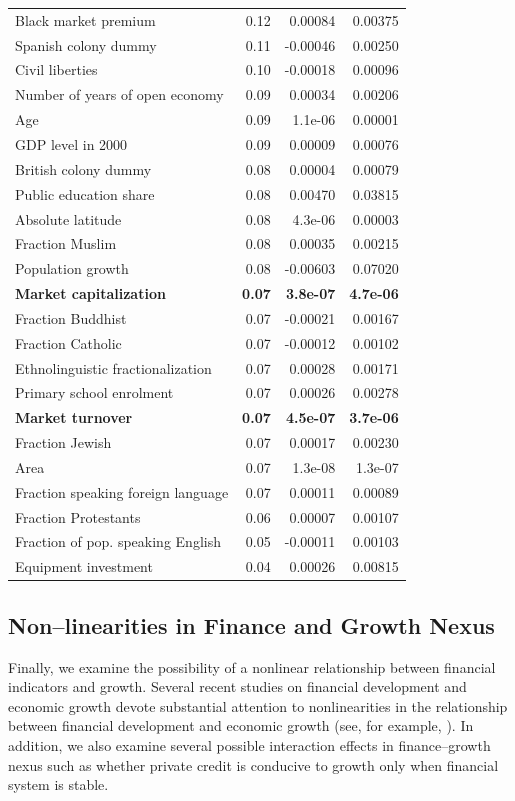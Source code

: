 \begin{refsection}
\begin{table}[!htbp]
\begin{tabular}{lrrr}
		  Black market premium & 0.12 & 0.00084 & 0.00375 \\ 
		  Spanish colony dummy & 0.11 & -0.00046 & 0.00250 \\ 
		  Civil liberties & 0.10 & -0.00018 & 0.00096 \\ 
		  Number of years of open economy & 0.09 & 0.00034 & 0.00206 \\ 
		  Age & 0.09 & 1.1e-06 & 0.00001 \\ 
		  GDP level in 2000 & 0.09 & 0.00009 & 0.00076 \\ 
		  British colony dummy & 0.08 & 0.00004 & 0.00079 \\ 
		  Public education share & 0.08 & 0.00470 & 0.03815 \\ 
		  Absolute latitude & 0.08 & 4.3e-06 & 0.00003 \\ 
		  Fraction Muslim & 0.08 & 0.00035 & 0.00215 \\ 
		  Population growth & 0.08 & -0.00603 & 0.07020 \\ 
		  \textbf{Market capitalization} & \textbf{0.07} & \textbf{3.8e-07} & \textbf{4.7e-06} \\ 
		  Fraction Buddhist & 0.07 & -0.00021 & 0.00167 \\ 
		  Fraction Catholic & 0.07 & -0.00012 & 0.00102 \\ 
		  Ethnolinguistic fractionalization & 0.07 & 0.00028 & 0.00171 \\ 
		  Primary school enrolment & 0.07 & 0.00026 & 0.00278 \\ 
		  \textbf{Market turnover} & \textbf{0.07} & \textbf{4.5e-07} & \textbf{3.7e-06} \\ 
		  Fraction Jewish & 0.07 & 0.00017 & 0.00230 \\ 
		  Area & 0.07 & 1.3e-08 & 1.3e-07 \\ 
		  Fraction speaking foreign language & 0.07 & 0.00011 & 0.00089 \\ 
		  Fraction Protestants & 0.06 & 0.00007 & 0.00107 \\ 
		  Fraction of pop. speaking English & 0.05 & -0.00011 & 0.00103 \\ 
		  Equipment investment & 0.04 & 0.00026 & 0.00815 \\ 
		\bottomrule
	\end{tabular}
\end{table}

\subsection{Non--linearities in Finance and Growth Nexus}\label{ch2subsec:nonlin}
Finally, we examine the possibility of a nonlinear relationship between financial indicators and growth. Several recent studies on financial development and economic growth devote substantial attention to nonlinearities in the relationship between financial development and economic growth (see, for example, \textcite{CecchettiKharroubi2012, LawSingh2014}). In addition, we also examine several possible interaction effects in finance--growth nexus such as whether private credit is conducive to growth only when financial system is stable.


\end{refsection}
